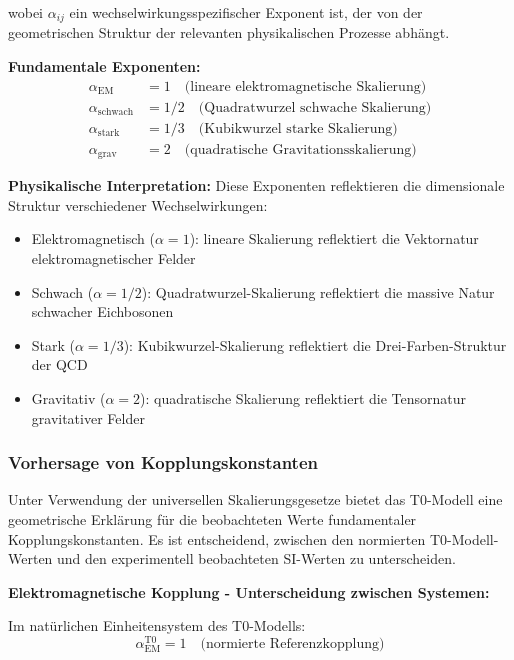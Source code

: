 \documentclass[12pt,a4paper]{article}
\begin{document}
	wobei $\alpha_{ij}$ ein wechselwirkungsspezifischer Exponent ist, der von der geometrischen Struktur der relevanten physikalischen Prozesse abhängt.
	
	\textbf{Fundamentale Exponenten:}
	\begin{align}
		\alpha_{\text{EM}} &= 1 \quad \text{(lineare elektromagnetische Skalierung)} \\
		\alpha_{\text{schwach}} &= 1/2 \quad \text{(Quadratwurzel schwache Skalierung)} \\
		\alpha_{\text{stark}} &= 1/3 \quad \text{(Kubikwurzel starke Skalierung)} \\
		\alpha_{\text{grav}} &= 2 \quad \text{(quadratische Gravitationsskalierung)}
	\end{align}
	
	\textbf{Physikalische Interpretation:} Diese Exponenten reflektieren die dimensionale Struktur verschiedener Wechselwirkungen:
	\begin{itemize}
		\item Elektromagnetisch ($\alpha = 1$): lineare Skalierung reflektiert die Vektornatur elektromagnetischer Felder
		\item Schwach ($\alpha = 1/2$): Quadratwurzel-Skalierung reflektiert die massive Natur schwacher Eichbosonen
		\item Stark ($\alpha = 1/3$): Kubikwurzel-Skalierung reflektiert die Drei-Farben-Struktur der QCD
		\item Gravitativ ($\alpha = 2$): quadratische Skalierung reflektiert die Tensornatur gravitativer Felder
	\end{itemize}
	
	\subsubsection{Vorhersage von Kopplungskonstanten}
	
	Unter Verwendung der universellen Skalierungsgesetze bietet das T0-Modell eine geometrische Erklärung für die beobachteten Werte fundamentaler Kopplungskonstanten. Es ist entscheidend, zwischen den normierten T0-Modell-Werten und den experimentell beobachteten SI-Werten zu unterscheiden.
	
	\textbf{Elektromagnetische Kopplung - Unterscheidung zwischen Systemen:}
	
	Im natürlichen Einheitensystem des T0-Modells:
	\begin{equation}
		\alpha_{\text{EM}}^{\text{T0}} = 1 \quad \text{(normierte Referenzkopplung)}
	\end{equation}
	
\end{document}
